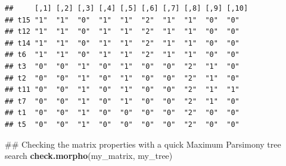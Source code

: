 \documentclass[]{book}
\newenvironment{Shaded}{\begin{snugshade}}{\end{snugshade}}
\newcommand{\KeywordTok}[1]{\textcolor[rgb]{0.13,0.29,0.53}{\textbf{#1}}}
\newcommand{\DataTypeTok}[1]{\textcolor[rgb]{0.13,0.29,0.53}{#1}}
\newcommand{\DecValTok}[1]{\textcolor[rgb]{0.00,0.00,0.81}{#1}}
\newcommand{\FloatTok}[1]{\textcolor[rgb]{0.00,0.00,0.81}{#1}}
\newcommand{\StringTok}[1]{\textcolor[rgb]{0.31,0.60,0.02}{#1}}
\newcommand{\OtherTok}[1]{\textcolor[rgb]{0.56,0.35,0.01}{#1}}
\newcommand{\OperatorTok}[1]{\textcolor[rgb]{0.81,0.36,0.00}{\textbf{#1}}}
\newcommand{\NormalTok}[1]{#1}
\theoremstyle{definition}
\theoremstyle{definition}
\theoremstyle{remark}
\begin{document}
\begin{Shaded}
\end{Shaded}

\begin{verbatim}
##     [,1] [,2] [,3] [,4] [,5] [,6] [,7] [,8] [,9] [,10]
## t15 "1"  "1"  "0"  "1"  "1"  "2"  "1"  "1"  "0"  "0"  
## t12 "1"  "1"  "0"  "1"  "1"  "2"  "1"  "1"  "0"  "0"  
## t14 "1"  "1"  "0"  "1"  "1"  "2"  "1"  "1"  "0"  "0"  
## t6  "1"  "1"  "0"  "1"  "1"  "2"  "1"  "1"  "0"  "0"  
## t3  "0"  "0"  "1"  "0"  "1"  "0"  "0"  "2"  "1"  "0"  
## t2  "0"  "0"  "1"  "0"  "1"  "0"  "0"  "2"  "1"  "0"  
## t11 "0"  "0"  "1"  "0"  "1"  "0"  "0"  "2"  "1"  "1"  
## t7  "0"  "0"  "1"  "0"  "1"  "0"  "0"  "2"  "1"  "0"  
## t1  "0"  "0"  "1"  "0"  "0"  "0"  "0"  "2"  "0"  "0"  
## t5  "0"  "0"  "1"  "0"  "0"  "0"  "0"  "2"  "0"  "0"
\end{verbatim}

\begin{Shaded}
\begin{Highlighting}[]
\NormalTok{## Checking the matrix properties with a quick Maximum Parsimony tree search}
\KeywordTok{check.morpho}\NormalTok{(my_matrix, my_tree)}
\end{Highlighting}
\end{Shaded}
\end{document}
